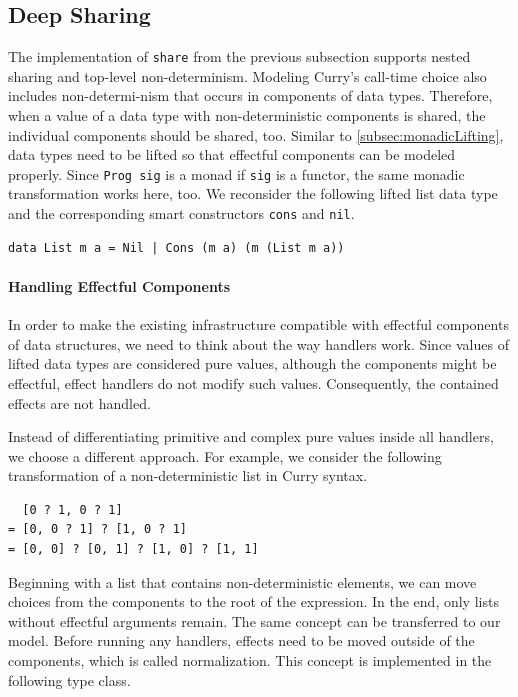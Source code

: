\documentclass[a4paper, 11pt, fleqn, twoside, abstract=on]{scrreprt}
\newcommand{\hinl}[1]{\texttt{#1}}
\begin{document}
\subsection{Deep Sharing}
\label{subsec:deepSharing}
The implementation of \hinl{share} from the previous subsection supports nested sharing and top-level non-determinism.
Modeling Curry's call-time choice also includes non-determi-nism that occurs in components of data types.
Therefore, when a value of a data type with non-deterministic components is shared, the individual components should be shared, too.
Similar to \autoref{subsec:monadicLifting}, data types need to be lifted so that effectful components can be modeled properly.
Since \hinl{Prog sig} is a monad if \hinl{sig} is a functor, the same monadic transformation works here, too.
We reconsider the following lifted list data type and the corresponding smart constructors \hinl{cons} and \hinl{nil}.

\begin{verbatim}
data List m a = Nil | Cons (m a) (m (List m a))
\end{verbatim}

\paragraph{Handling Effectful Components}
In order to make the existing infrastructure compatible with effectful components of data structures, we need to think about the way handlers work.
Since values of lifted data types are considered pure values, although the components might be effectful, effect handlers do not modify such values.
Consequently, the contained effects are not handled.

Instead of differentiating primitive and complex pure values inside all handlers, we choose a different approach.
For example, we consider the following transformation of a non-deterministic list in Curry syntax.

\begin{verbatim}
  [0 ? 1, 0 ? 1]
= [0, 0 ? 1] ? [1, 0 ? 1]
= [0, 0] ? [0, 1] ? [1, 0] ? [1, 1]
\end{verbatim}

Beginning with a list that contains non-deterministic elements, we can move choices from the components to the root of the expression.
In the end, only lists without effectful arguments remain.
The same concept can be transferred to our model.
Before running any handlers, effects need to be moved outside of the components, which is called normalization.
This concept is implemented in the following type class.
\end{document}
